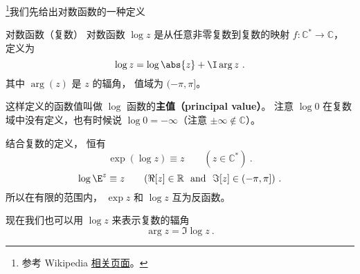 
\begin{issues}
\issueDraft
\end{issues}


\footnote{参考 Wikipedia \href{https://en.wikipedia.org/wiki/Complex_logarithm}{相关页面}。}我们先给出对数函数的一种定义
\begin{definition}{对数函数（复数）}
对数函数 $\log z$ 是从任意非零复数到复数的映射 $f:\mathbb C^*\to \mathbb C$， 定义为
\begin{equation}
\log z = \log\abs{z} + \I \arg z~.
\end{equation}
其中 $\arg(z)$ 是 $z$ 的辐角， 值域为 $(-\pi, \pi]$。
\end{definition}
这样定义的函数值叫做 $\log$ 函数的\textbf{主值（principal value）}。 注意 $\log 0$ 在复数域中没有定义，也有时候说 $\log 0 = -\infty$（注意 $\pm\infty \notin \mathbb C$）。

结合复数的定义， 恒有
\begin{equation}
\exp(\log z) \equiv z \qquad (z \in \mathbb C^*)~.
\end{equation}
\begin{equation}
\log \E^z \equiv z \qquad (\Re[z]\in\mathbb R\ \text{ and }\ \Im[z]\in(-\pi, \pi])~.
\end{equation}
所以在有限的范围内， $\exp z$ 和 $\log z$ 互为反函数。

现在我们也可以用 $\log z$ 来表示复数的辐角
\begin{equation}
\arg z = \Im\log z~.
\end{equation}
